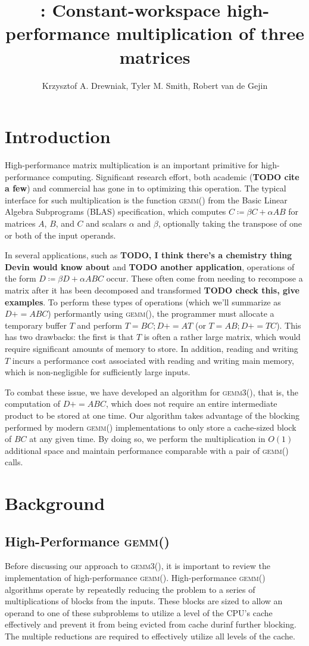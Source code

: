 \documentclass[12pt]{article}
\title{\gemmt{}: Constant-workspace high-performance multiplication of three matrices}
\author{Krzysztof A. Drewniak, Tyler M. Smith, Robert van de Gejin}
\newcommand*{\pluseq}{\mathrel{{+}{=}}}
\newcommand*{\gemmt}{{\textsc{gemm3()}}}
\newcommand*{\gemm}{{\textsc{gemm()}}}
\begin{document}
\maketitle{}
\section{Introduction}
High-performance matrix multiplication is an important primitive for high-performance computing.
Significant research effort, both academic (\textbf{TODO cite a few}) and commercial has gone in to optimizing this operation.
The typical interface for such multiplication is the function \gemm{} from the Basic Linear Algebra Subprograms (BLAS) specification, which computes $C \coloneqq \beta C + \alpha AB$ for matrices $A$, $B$, and $C$ and scalars $\alpha$ and $\beta$, optionally taking the transpose of one or both of the input operands.

In several applications, such as \textbf{TODO, I think there's a chemistry thing Devin would know about} and \textbf{TODO another application}, operations of the form $D \coloneqq \beta D + \alpha ABC$ occur.
These often come from needing to recompose a matrix after it has been decomposed and transformed \textbf{TODO check this, give examples}.
To perform these types of operations (which we'll summarize as $D \pluseq ABC$) performantly using \gemm{}, the programmer must allocate a temporary buffer $T$ and perform $T = BC; D \pluseq AT$ (or $T = AB; D \pluseq TC$).
This has two drawbacks: the first is that $T$ is often a rather large matrix, which would require significant amounts of memory to store.
In addition, reading and writing $T$ incurs a performance cost associated with reading and writing main memory, which is non-negligible for sufficiently large inputs.

To combat these issue, we have developed an algorithm for \gemmt{}, that is, the computation of $D \pluseq ABC$, which does not require an entire intermediate product to be stored at one time.
Our algorithm takes advantage of the blocking performed by modern \gemm{} implementations to only store a cache-sized block of $BC$ at any given time.
By doing so, we perform the multiplication in $O(1)$ additional space and maintain performance comparable with a pair of \gemm{} calls.

\section{Background}
\subsection{High-Performance \gemm{}}
Before discussing our approach to \gemmt{}, it is important to review the implementation of high-performance \gemm{}.
High-performance \gemm{} algorithms operate by repeatedly reducing the problem to a series of multiplications of blocks from the inputs.
These blocks are sized to allow an operand to one of these subproblems to utilize a level of the CPU's cache effectively and prevent it from being evicted from cache durinf further blocking.
The multiple reductions are required to effectively utilize all levels of the cache.
\end{document}
